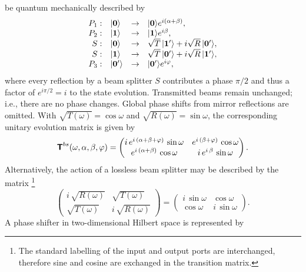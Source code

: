 {be quantum mechanically described by \cite{green-horn-zei}
\begin{equation}
\begin{array}{rlcl}
P_1:&\vert {\bf 0}\rangle  &\rightarrow& \vert {\bf 0}\rangle e^{i(\alpha +\beta)}
 , \\
P_2:&\vert {\bf 1}\rangle  &\rightarrow& \vert {\bf 1}\rangle
e^{i \beta}
, \\
S:&\vert {\bf 0} \rangle
&\rightarrow& \sqrt{T}\,\vert {\bf 1}'\rangle  +i\sqrt{R}\,\vert {\bf 0}'\rangle
, \\
S:&\vert {\bf 1}\rangle  &\rightarrow& \sqrt{T}\,\vert {\bf 0}'\rangle  +i\sqrt{R}\,\vert
{\bf 1}'\rangle
, \\
P_3:&\vert {\bf 0}'\rangle  &\rightarrow& \vert {\bf 0}'\rangle e^{i
\varphi
} ,
\end{array}
\end{equation}
where
every reflection by a beam splitter $S$ contributes a phase $\pi /2$
and thus a factor of $e^{i\pi /2}=i$ to the state evolution.
Transmitted beams remain unchanged; i.e., there are no phase changes.
Global phase shifts from mirror reflections are omitted.
With
$\sqrt{T(\omega )}=\cos \omega$
and
$\sqrt{R(\omega )}=\sin \omega$,
the corresponding unitary evolution matrix
is given by
\begin{equation}
\textsf{\textbf{T}}^{bs} (\omega ,\alpha ,\beta ,\varphi )=
\begin{pmatrix}
 i \,e^{i \,\left( \alpha + \beta + \varphi \right) }\,\sin \omega &
   e^{i \,\left( \beta + \varphi \right) }\,\cos \omega
\\
   e^{i \,\left( \alpha + \beta \right) }\, \cos \omega&
i \,e^{i \,\beta}\,\sin \omega
\end{pmatrix}
.
\label{e:quid1}
\end{equation}
Alternatively, the action of a lossless beam splitter may be
described by the matrix
\footnote{
The standard labelling of the input and output ports are interchanged,
therefore sine and cosine are exchanged in the transition matrix.}
$$
\left(
\begin{array}{cc}
i \, \sqrt{R(\omega )}& \sqrt{T(\omega )}
\\
\sqrt{T(\omega )}&  i\, \sqrt{R(\omega )}
 \end{array}
\right)
=
\left(
\begin{array}{cc}
i \, \sin \omega  & \cos \omega
\\
\cos \omega&  i\, \sin \omega
 \end{array}
\right)
.
$$
A phase shifter in two-dimensional Hilbert space is represented by
}
